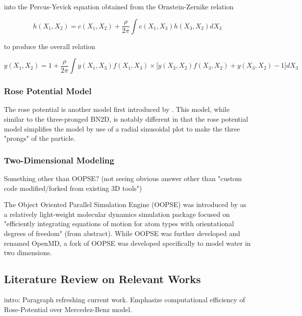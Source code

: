 into the Percus-Yevick equation obtained from the Ornstein-Zernike relation 

\begin{equation}
h(X_{1}, X_{2}) = c(X_{1}, X_{2}) + \frac{\rho}{2\pi}\int c(X_{1}, X_{3}) h(X_{3}, X_{2})dX_{3}
\end{equation}

to produce the overall relation

\begin{equation}
y(X_{1}, X_{2}) = 1 + \frac{\rho}{2\pi}\int y(X_{1}, X_{3})f(X_{1}, X_{3}) \times \Big[ y(X_{3}, X_{2})f(X_{3}, X_{2}) + y(X_{3}, X_{2}) - 1 \Big] dX_{3}
\end{equation}


\subsubsection{Rose Potential Model}

The rose potential is another model first introduced by \cite{RoseOG}.
This model, while similar to the three-pronged BN2D, is notably different in that the rose potential model simplifies the model by use of a radial sinusoidal plot to make the three "prongs" of the particle. 

\subsubsection{Two-Dimensional Modeling}

Something other than OOPSE? (not seeing obvious answer other than "custom code modified/forked from existing 3D tools")

The Object Oriented Parallel Simulation Engine (OOPSE) was introduced by \cite{OOPSE} as a relatively light-weight molecular dynamics simulation package focused on "efficiently integrating equations of motion for atom types with orientational degrees of freedom" (from abstract).
While OOPSE was further developed and renamed OpenMD, a fork of OOPSE was developed specifically to model water in two dimensions.

\subsection{Literature Review on Relevant Works}









intro: Paragraph refreshing current work. Emphasize computational efficiency of Rose-Potential over Mercedez-Benz model.

